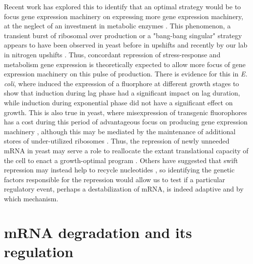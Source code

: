 Recent work has explored this to identify that an optimal strategy
would be to focus gene expression machinery on expressing more gene 
expression machinery, at the neglect of an investment in metabolic
enzymes \parencite{giordano2016dynamical}. 
This phenomenon, a transient burst of ribosomal over production or a
"bang-bang singular" strategy appears to have been observed in
yeast before in upshifts 
\parencite{wehr1969macromolecular,griffioen1996ribosomal} 
and recently by our lab in nitrogen upshifts 
\parencite{airoldi2016steady}.
Thus, concordant repression of stress-response and
metabolism gene expression is theoretically expected to allow more
focus of gene expression machinery on this pulse of production.
There is evidence for this in \textit{E. coli}, where
\cite{shachrai2010cost} induced the expression of a fluorphore at
different growth stages to show that induction during lag phase 
had a significant impact on lag duration, while induction during
exponential phase did not have a significant effect on growth.
This is also true in yeast, where misexpression of transgenic 
fluorophores has a cost during this period of advantageous focus on 
producing gene expression machinery \parencite{kafri2016cost},
although this may be mediated by the maintenance of additional
stores of under-utilized ribosomes
\parencite{metzl2017principles,waldron1977evidence}.
Thus, the repression of newly unneeded mRNA in yeast may serve a 
role to reallocate the extant translational
capacity of the cell to enact a growth-optimal program 
\parencite{kief1981coordinate}. 
Others have suggested that swift repression may instead
help to recycle nucleotides \parencite{kresnowati2006transcriptome},
so identifying the genetic factors responsible for the repression 
would allow us to test if a particular regulatory event,
perhaps a destabilization of mRNA, is indeed adaptive and by which
mechanism.

\section{mRNA degradation and its regulation}


